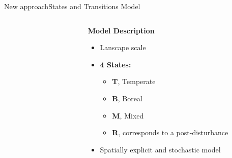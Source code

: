 \documentclass[10pt,aspectratio=149]{beamer}
\begin{document}


\begin{frame}{New approach}{States and Transitions Model}


\begin{columns}[t]
	\begin{column}[t]{.40\paperwidth}
		\begin{figure}
			\small{}
		\end{figure}
	\end{column}
	\begin{column}{.50\paperwidth}
	\textbf{Model Description}
		\begin{itemize}
			\item Lanscape scale
			\item \textbf{4 States:}
			\begin{itemize}
				\item \textcolor{Temperate}{\textbf{T}}, Temperate
				\item \textcolor{Boreal}{\textbf{B}}, Boreal
				\item \textcolor{Mixed}{\textbf{M}}, Mixed
				\item \textcolor{Regeneration}{\textbf{R}}, corresponds to a post-disturbance
			\end{itemize}
			\item Spatially explicit and stochastic model
		\end{itemize}
	\end{column}
\end{columns}
\end{frame}


\end{document}
